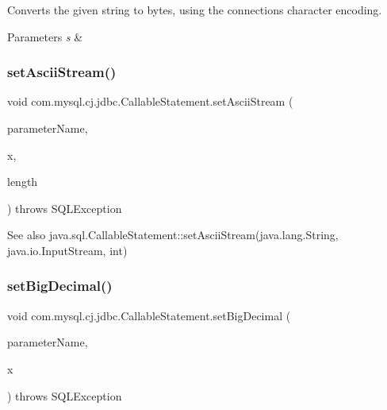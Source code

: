 Converts the given string to bytes, using the connection\textquotesingle{}s character encoding.


\begin{DoxyParams}{Parameters}
{\em s} & \\
\hline
\end{DoxyParams}
\mbox{\label{classcom_1_1mysql_1_1cj_1_1jdbc_1_1_callable_statement_a69641688613693dda99a792231cdb153}} 
\subsubsection{\texorpdfstring{set\+Ascii\+Stream()}{setAsciiStream()}}
{\footnotesize\ttfamily void com.\+mysql.\+cj.\+jdbc.\+Callable\+Statement.\+set\+Ascii\+Stream (\begin{DoxyParamCaption}\item[{String}]{parameter\+Name,  }\item[{Input\+Stream}]{x,  }\item[{int}]{length }\end{DoxyParamCaption}) throws S\+Q\+L\+Exception}

\begin{DoxySeeAlso}{See also}
java.\+sql.\+Callable\+Statement\+::set\+Ascii\+Stream(java.\+lang.\+String, java.\+io.\+Input\+Stream, int) 
\end{DoxySeeAlso}
\mbox{\label{classcom_1_1mysql_1_1cj_1_1jdbc_1_1_callable_statement_a4a068a406dc0362622e2204d21a8e70a}} 
\subsubsection{\texorpdfstring{set\+Big\+Decimal()}{setBigDecimal()}}
{\footnotesize\ttfamily void com.\+mysql.\+cj.\+jdbc.\+Callable\+Statement.\+set\+Big\+Decimal (\begin{DoxyParamCaption}\item[{String}]{parameter\+Name,  }\item[{Big\+Decimal}]{x }\end{DoxyParamCaption}) throws S\+Q\+L\+Exception}

